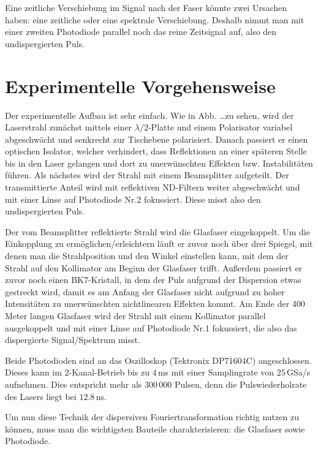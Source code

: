 \documentclass[bachelor,       %
               twoside,        %
               BCOR10mm,       %
               english,ngerman, %
               ]{GAUBM}
\begin{document}
Eine zeitliche Verschiebung im Signal nach der Faser könnte zwei Ursachen haben: eine zeitliche oder eine spektrale Verschiebung.
Deshalb nimmt man mit einer zweiten Photodiode parallel noch das reine Zeitsignal auf, also den undispergierten Puls.

\chapter{Experimentelle Vorgehensweise}
Der experimentelle Aufbau ist sehr einfach.
Wie in Abb. \dots zu sehen, wird der Laserstrahl zunächst mittels einer $\lambda/2$-Platte und einem Polarisator variabel abgeschwächt und senkrecht zur Tischebene polarisiert.
Danach passiert er einen optischen Isolator, welcher verhindert, dass Reflektionen an einer späteren Stelle bis in den Laser gelangen und dort zu unerwünschten Effekten bzw. Instabilitäten führen.
Als nächstes wird der Strahl mit einem Beamsplitter aufgeteilt.
Der transmittierte Anteil wird mit reflektiven ND-Filtern weiter abgeschwächt und mit einer Linse auf Photodiode Nr.2 fokussiert.
Diese misst also den undispergierten Puls.

Der vom Beamsplitter reflektierte Strahl wird die Glasfaser eingekoppelt.
Um die Einkopplung zu ermöglichen/erleichtern läuft er zuvor noch über drei Spiegel, mit denen man die Strahlposition und den Winkel einstellen kann, mit dem der Strahl auf den Kollimator am Beginn der Glasfaser trifft.
Außerdem passiert er zuvor noch einen BK7-Kristall, in dem der Puls aufgrund der Dispersion etwas gestreckt wird, damit es am Anfang der Glasfaser nicht aufgrund zu hoher Intensitäten zu unerwünschten nichtlinearen Effekten kommt.
Am Ende der 400 Meter langen Glasfaser wird der Strahl mit einem Kollimator parallel ausgekoppelt und mit einer Linse auf Photodiode Nr.1 fokussiert, die also das dispergierte Signal/Spektrum misst.

Beide Photodioden sind an das Oszilloskop (Tektronix DP71604C) angeschlossen.
Dieses kann im 2-Kanal-Betrieb bis zu $4\,$ms mit einer Samplingrate von $25\,$GSa/s aufnehmen.
Dies entspricht mehr als 300\,000 Pulsen, denn die Pulswiederholrate des Lasers liegt bei $12.8\,$ns.


Um nun diese Technik der dispersiven Fouriertransformation richtig nutzen zu können, muss man die wichtigsten Bauteile charakterisieren: die Glasfaser sowie Photodiode.
\end{document}
